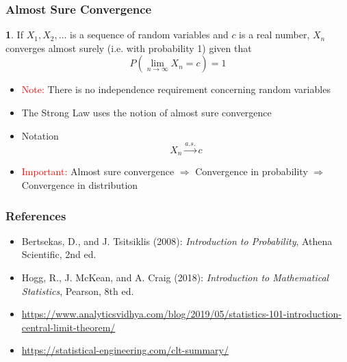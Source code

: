 \documentclass[10pt]{beamer}
\theoremstyle{definition}
\newtheorem{definition}{\translate{Definition}}
\begin{document}
\begin{frame}[fragile]
	\frametitle{Almost Sure Convergence}
	\begin{definition}
		If $ X_{1}, X_{2},\ldots $ is a sequence of random variables and $ c $ is a real number, $ X_{n} $ converges almost surely (i.e. with probability 1) given that
		\[
			P\left(\lim_{n\to\infty} X_{n} = c\right) = 1
		\]
	\end{definition}
	
	\begin{itemize}
		\item \textcolor{red}{Note:} There is no independence requirement concerning random variables 
		
		\item The Strong Law uses the notion of almost sure convergence
		
		\item Notation
		\[
			X_{n} \overset{a.s.}{\to} c
		\]
		
		\item \textcolor{red}{Important:} Almost sure convergence $ \Rightarrow $ Convergence in probability $ \Rightarrow $ Convergence in distribution
	\end{itemize}
\end{frame}

\begin{frame}[fragile]
	\frametitle{References}
	\begin{itemize}
		\item Bertsekas, D., and J. Tsitsiklis (2008): \textit{Introduction to Probability}, Athena Scientific, 2nd ed.
		
		\item Hogg, R., J. McKean, and A. Craig (2018): \textit{Introduction to Mathematical Statistics}, Pearson, 8th ed.
		
		\item \url{https://www.analyticsvidhya.com/blog/2019/05/statistics-101-introduction-central-limit-theorem/}
		
		\item \url{https://statistical-engineering.com/clt-summary/}
	\end{itemize}
\end{frame}
\end{document}
